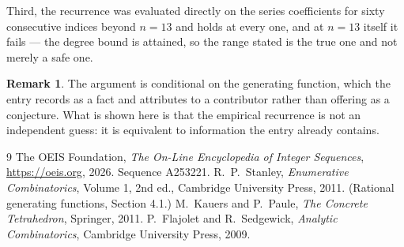 \documentclass[11pt,a4paper]{article}
\theoremstyle{plain}
\theoremstyle{definition}
\newtheorem{remark}[theorem]{Remark}
\begin{document}
Third, the recurrence was evaluated directly on the series coefficients for sixty consecutive
indices beyond $n=13$ and holds at every one, and at $n=13$ itself it fails --- the
degree bound is attained, so the range stated is the true one and not merely a safe one.

\begin{remark}
The argument is conditional on the generating function, which the entry records as a fact and
attributes to a contributor rather than offering as a conjecture. What is shown here is that
the empirical recurrence is not an independent guess: it is equivalent to information the
entry already contains.
\end{remark}

\begin{thebibliography}{9}
 The OEIS Foundation, \emph{The On-Line Encyclopedia of Integer
Sequences}, \url{https://oeis.org}, 2026. Sequence A253221.
 R.~P.~Stanley, \emph{Enumerative Combinatorics}, Volume 1, 2nd ed.,
Cambridge University Press, 2011. (Rational generating functions, Section 4.1.)
 M.~Kauers and P.~Paule, \emph{The Concrete Tetrahedron}, Springer, 2011.
 P.~Flajolet and R.~Sedgewick, \emph{Analytic Combinatorics}, Cambridge
University Press, 2009.
\end{thebibliography}
\end{document}
